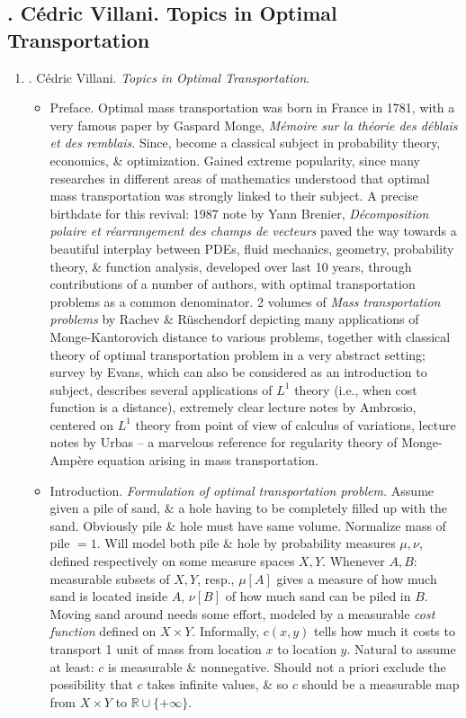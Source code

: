 \documentclass{article}
\begin{document}

\subsection{\cite{Villani2003}. {\sc C\'{e}dric Villani}. Topics in Optimal Transportation}

\begin{enumerate}
	\item \cite{Villani2003}. {\sc C\'{e}dric Villani}. {\it Topics in Optimal Transportation}.
	
	\begin{itemize}
		\item {\sf Preface.} Optimal mass transportation was born in France in 1781, with a very famous paper by {\sc Gaspard Monge}, {\it M\'emoire sur la th\'eorie des d\'eblais et des remblais}. Since, become a classical subject in probability theory, economics, \& optimization. Gained extreme popularity, since many researches in different areas of mathematics understood that optimal mass transportation was strongly linked to their subject. A precise birthdate for this revival: 1987 note by {\sc Yann Brenier}, {\it D\'ecomposition polaire et r\'earrangement des champs de vecteurs} paved the way towards a beautiful interplay between PDEs, fluid mechanics, geometry, probability theory, \& function analysis, developed over last 10 years, through contributions of a number of authors, with optimal transportation problems as a common denominator. 2 volumes of {\it Mass transportation problems} by {\sc Rachev \& R\"uschendorf} depicting many applications of Monge-Kantorovich distance to various problems, together with classical theory of optimal transportation problem in a very abstract setting; survey by {\sc Evans}, which can also be considered as an introduction to subject, describes several applications of $L^1$ theory (i.e., when cost function is a distance), extremely clear lecture notes by {\sc Ambrosio}, centered on $L^1$ theory from point of view of calculus of variations, lecture notes by {\sc Urbas} -- a marvelous reference for regularity theory of Monge-Amp\`ere equation arising in mass transportation.
		
		\item {\sf Introduction.} {\it Formulation of optimal transportation problem.} Assume given a pile of sand, \& a hole having to be completely filled up with the sand. Obviously pile \& hole must have same volume. Normalize mass of pile $= 1$. Will model both pile \& hole by probability measures $\mu,\nu$, defined respectively on some measure spaces $X,Y$. Whenever $A,B$: measurable subsets of $X,Y$, resp., $\mu[A]$ gives a measure of how much sand is located inside $A$, $\nu[B]$ of how much sand can be piled in $B$. Moving sand around needs some effort, modeled by a measurable {\it cost function} defined on $X\times Y$. Informally, $c(x,y)$ tells how much it costs to transport 1 unit of mass from location $x$ to location $y$. Natural to assume at least: $c$ is measurable \& nonnegative. Should not a priori exclude the possibility that $c$ takes infinite values, \& so $c$ should be a measurable map from $X\times Y$ to $\mathbb{R}\cup\{+\infty\}$.
		

\end{itemize}
\end{enumerate}
\end{document}
